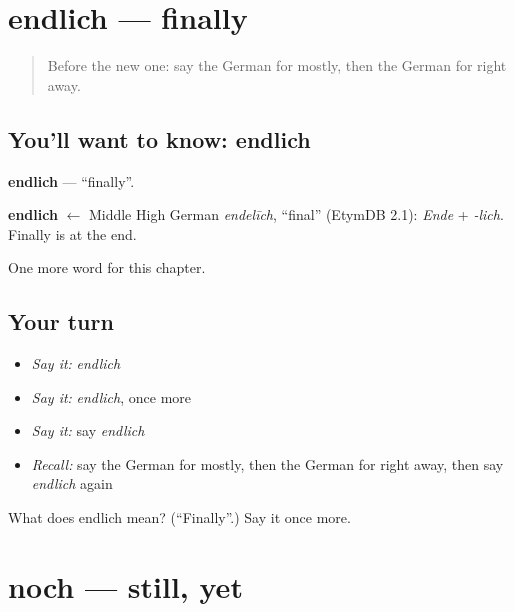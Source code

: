 \section[endlich]{endlich — finally}

\label{lesson:GE-C170-endlich}



\begin{quote}
Before the new one: say the German for mostly, then the German for right away.
\end{quote}

\subsection*{You'll want to know: endlich}
\textbf{endlich} — \textquotedblleft{}finally\textquotedblright{}.

\begin{cousinweb}
\textbf{endlich} $\leftarrow$ Middle High German \emph{endelīch}, \textquotedblleft{}final\textquotedblright{} (EtymDB 2.1): \emph{Ende} + \emph{-lich}. Finally is at the end.
\end{cousinweb}

\begin{grammarlens}[title={What you've built}]
One more word for this chapter.
\end{grammarlens}

\subsection*{Your turn}
\begin{itemize}
\raggedright
  \item \emph{Say it:} \emph{endlich}
  \item \emph{Say it:} \emph{endlich}, once more
  \item \emph{Say it:} say \emph{endlich}
  \item \emph{Recall:} say the German for mostly, then the German for right away, then say \emph{endlich} again
\end{itemize}

\begin{tcolorbox}[breakable,colback=teal!4,colframe=teal!35!black,title={Before you move on}]
What does endlich mean? (\textquotedblleft{}Finally\textquotedblright{}.) Say it once more.
\end{tcolorbox}
\section[noch]{noch — still, yet}

